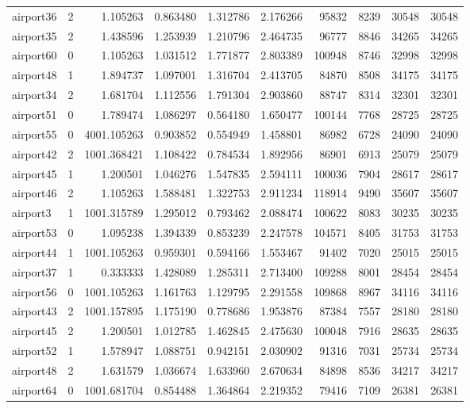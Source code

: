\begin{longtable}{|l|r|r|r|r|r|r|r|r|r|}
airport36 & 2 & 1.105263 & 0.863480 & 1.312786 & 2.176266 & 95832 & 8239 & 30548 & 30548 \\
airport35 & 2 & 1.438596 & 1.253939 & 1.210796 & 2.464735 & 96777 & 8846 & 34265 & 34265 \\
airport60 & 0 & 1.105263 & 1.031512 & 1.771877 & 2.803389 & 100948 & 8746 & 32998 & 32998 \\
airport48 & 1 & 1.894737 & 1.097001 & 1.316704 & 2.413705 & 84870 & 8508 & 34175 & 34175 \\
airport34 & 2 & 1.681704 & 1.112556 & 1.791304 & 2.903860 & 88747 & 8314 & 32301 & 32301 \\
airport51 & 0 & 1.789474 & 1.086297 & 0.564180 & 1.650477 & 100144 & 7768 & 28725 & 28725 \\
airport55 & 0 & 4001.105263 & 0.903852 & 0.554949 & 1.458801 & 86982 & 6728 & 24090 & 24090 \\
airport42 & 2 & 1001.368421 & 1.108422 & 0.784534 & 1.892956 & 86901 & 6913 & 25079 & 25079 \\
airport45 & 1 & 1.200501 & 1.046276 & 1.547835 & 2.594111 & 100036 & 7904 & 28617 & 28617 \\
airport46 & 2 & 1.105263 & 1.588481 & 1.322753 & 2.911234 & 118914 & 9490 & 35607 & 35607 \\
airport3 & 1 & 1001.315789 & 1.295012 & 0.793462 & 2.088474 & 100622 & 8083 & 30235 & 30235 \\
airport53 & 0 & 1.095238 & 1.394339 & 0.853239 & 2.247578 & 104571 & 8405 & 31753 & 31753 \\
airport44 & 1 & 1001.105263 & 0.959301 & 0.594166 & 1.553467 & 91402 & 7020 & 25015 & 25015 \\
airport37 & 1 & 0.333333 & 1.428089 & 1.285311 & 2.713400 & 109288 & 8001 & 28454 & 28454 \\
airport56 & 0 & 1001.105263 & 1.161763 & 1.129795 & 2.291558 & 109868 & 8967 & 34116 & 34116 \\
airport43 & 2 & 1001.157895 & 1.175190 & 0.778686 & 1.953876 & 87384 & 7557 & 28180 & 28180 \\
airport45 & 2 & 1.200501 & 1.012785 & 1.462845 & 2.475630 & 100048 & 7916 & 28635 & 28635 \\
airport52 & 1 & 1.578947 & 1.088751 & 0.942151 & 2.030902 & 91316 & 7031 & 25734 & 25734 \\
airport48 & 2 & 1.631579 & 1.036674 & 1.633960 & 2.670634 & 84898 & 8536 & 34217 & 34217 \\
airport64 & 0 & 1001.681704 & 0.854488 & 1.364864 & 2.219352 & 79416 & 7109 & 26381 & 26381 \\

\end{longtable}
